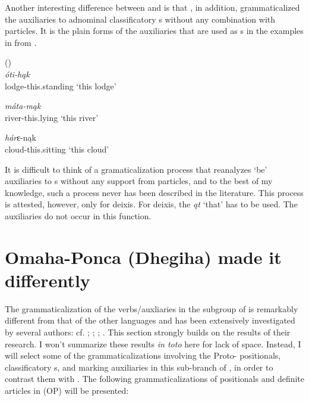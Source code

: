 \documentclass[output=paper]{langsci/langscibook}
\begin{document}
Another interesting difference between  and  is that , in addition, grammaticalized the  auxiliaries to adnominal classificatory s without any combination with  particles. It is the plain forms of the  auxiliaries that are used as s in the examples in  from \citeauthor{Kennard1936}. 


\ea  \label{ex:helmbrecht:20}
 (\citealt[28f]{Kennard1936})\\


  \textit{óti-hąk}     \\
  lodge-this.standing
\glt `this lodge'


  \textit{máta-mąk}  \\
  river-this.lying
\glt   `this river'


  \textit{hár}{ɛ}{-nąk}   \\
  cloud-this.sitting       
\glt  `this cloud'
\z

It is difficult to think of a gramaticalization process that reanalyzes `be' auxiliaries to  s without any support from  particles, and to the best of my knowledge, such a process never has been described in the literature. This process is attested, however, only for  deixis. For  deixis, the \textit{ąt} `that'  has to be used. The  auxiliaries do not occur in this function.

\section{Omaha-Ponca (Dhegiha) made it differently}\label{sec:helmbrecht:6}

The grammaticalization of the  verbs\slash auxliaries in the  subgroup of  is remarkably different from that of the other  languages and has been extensively investigated by several authors: cf. \citealt{Rankin1977}; \citealt{Barron1982}; \citealt{Rankin2004a}; \citealt{Eschenberg2005}. This section strongly builds on the results of their research. I won't summarize these results \textit{in toto} here for lack of space. Instead, I will select some of the grammaticalizations involving the Proto- positionals, classificatory s, and  marking auxiliaries in this sub-branch of , in order to contrast them with . The following grammaticalizations of positionals and definite articles in  (OP) will be presented:\newpage
\end{document}
